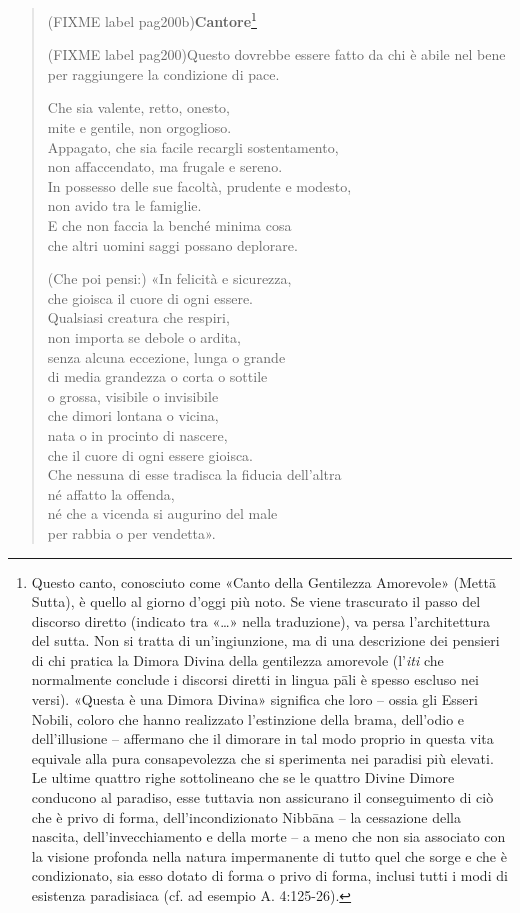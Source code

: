 \begin{quote}
(FIXME label pag200b)\textbf{Cantore}\footnote{Questo canto, conosciuto come «Canto della Gentilezza Amorevole» (Mettā Sutta), è quello al giorno d’oggi più noto. Se viene trascurato il passo del discorso diretto (indicato tra «…» nella traduzione), va persa l’architettura del sutta. Non si tratta di un’ingiunzione, ma di una descrizione dei pensieri di chi pratica la Dimora Divina della gentilezza amorevole (l’\emph{iti} che normalmente conclude i discorsi diretti in lingua pāli è spesso escluso nei versi). «Questa è una Dimora Divina» significa che loro – ossia gli Esseri Nobili, coloro che hanno realizzato l’estinzione della brama, dell’odio e dell’illusione – affermano che il dimorare in tal modo proprio in questa vita equivale alla pura consapevolezza che si sperimenta nei paradisi più elevati. Le ultime quattro righe sottolineano che se le quattro Divine Dimore conducono al paradiso, esse tuttavia non assicurano il conseguimento di ciò che è privo di forma, dell’incondizionato Nibbāna – la cessazione della nascita, dell’invecchiamento e della morte – a meno che non sia associato con la visione profonda nella natura impermanente di tutto quel che sorge e che è condizionato, sia esso dotato di forma o privo di forma, inclusi tutti i modi di esistenza paradisiaca (cf. ad esempio A. 4:125-26).}


(FIXME label pag200)Questo dovrebbe essere fatto da chi è abile nel bene \\
per raggiungere la condizione di pace.


Che sia valente, retto, onesto, \\
mite e gentile, non orgoglioso. \\
Appagato, che sia facile recargli sostentamento, \\
non affaccendato, ma frugale e sereno. \\
In possesso delle sue facoltà, prudente e modesto, \\
non avido tra le famiglie. \\
E che non faccia la benché minima cosa \\
che altri uomini saggi possano deplorare.


(Che poi pensi:) «In felicità e sicurezza, \\
che gioisca il cuore di ogni essere. \\
Qualsiasi creatura che respiri, \\
non importa se debole o ardita, \\
senza alcuna eccezione, lunga o grande \\
di media grandezza o corta o sottile \\
o grossa, visibile o invisibile \\
che dimori lontana o vicina, \\
nata o in procinto di nascere, \\
che il cuore di ogni essere gioisca. \\
Che nessuna di esse tradisca la fiducia dell’altra \\
né affatto la offenda, \\
né che a vicenda si augurino del male \\
per rabbia o per vendetta».



\end{quote}

